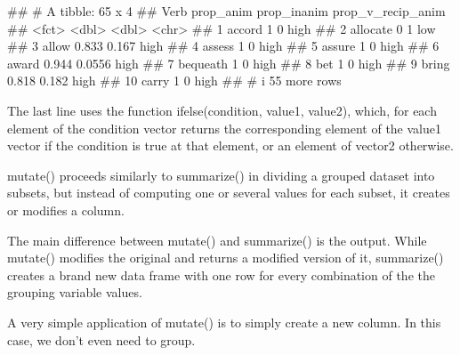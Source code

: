 \documentclass[
]{book}
\newenvironment{Shaded}{\begin{snugshade}}{\end{snugshade}}
\newcommand{\AttributeTok}[1]{\textcolor[rgb]{0.13,0.29,0.53}{#1}}
\newcommand{\CommentTok}[1]{\textcolor[rgb]{0.56,0.35,0.01}{\textit{#1}}}
\newcommand{\DecValTok}[1]{\textcolor[rgb]{0.00,0.00,0.81}{#1}}
\newcommand{\FunctionTok}[1]{\textcolor[rgb]{0.13,0.29,0.53}{\textbf{#1}}}
\newcommand{\NormalTok}[1]{#1}
\newcommand{\OtherTok}[1]{\textcolor[rgb]{0.56,0.35,0.01}{#1}}
\newcommand{\SpecialCharTok}[1]{\textcolor[rgb]{0.81,0.36,0.00}{\textbf{#1}}}
\newcommand{\StringTok}[1]{\textcolor[rgb]{0.31,0.60,0.02}{#1}}
\begin{document}
\begin{Shaded}
\begin{Highlighting}[]
\NormalTok{\#\# \# A tibble: 65 x 4}
\NormalTok{\#\#    Verb     prop\_anim prop\_inanim prop\_v\_recip\_anim}
\NormalTok{\#\#    \textless{}fct\textgreater{}        \textless{}dbl\textgreater{}       \textless{}dbl\textgreater{} \textless{}chr\textgreater{}            }
\NormalTok{\#\#  1 accord       1          0      high             }
\NormalTok{\#\#  2 allocate     0          1      low              }
\NormalTok{\#\#  3 allow        0.833      0.167  high             }
\NormalTok{\#\#  4 assess       1          0      high             }
\NormalTok{\#\#  5 assure       1          0      high             }
\NormalTok{\#\#  6 award        0.944      0.0556 high             }
\NormalTok{\#\#  7 bequeath     1          0      high             }
\NormalTok{\#\#  8 bet          1          0      high             }
\NormalTok{\#\#  9 bring        0.818      0.182  high             }
\NormalTok{\#\# 10 carry        1          0      high             }
\NormalTok{\#\# \# i 55 more rows}
\end{Highlighting}
\end{Shaded}

The last line uses the function ifelse(condition, value1, value2), which, for each element of the condition vector returns the corresponding element of the value1 vector if the condition is true at that element, or an element of vector2 otherwise.

mutate() proceeds similarly to summarize() in dividing a grouped dataset into subsets, but instead of computing one or several values for each subset, it creates or modifies a column.

The main difference between mutate() and summarize() is the output. While mutate() modifies the original and returns a modified version of it, summarize() creates a brand new data frame with one row for every combination of the the grouping variable values.

A very simple application of mutate() is to simply create a new column. In this case, we don't even need to group.

\begin{Shaded}
\end{Shaded}
\end{document}

